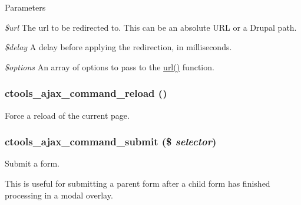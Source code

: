 \begin{DoxyParams}{Parameters}
\item[{\em \$url}]The url to be redirected to. This can be an absolute URL or a Drupal path. \item[{\em \$delay}]A delay before applying the redirection, in milliseconds. \item[{\em \$options}]An array of options to pass to the \hyperlink{common_8inc_a43b2a0594431556db49df980801d8807}{url()} function. \end{DoxyParams}
\hypertarget{profiles_2dosomething_2modules_2contrib_2ctools_2includes_2ajax_8inc_abadcd3021f5a0dedff23944d40dbc1ae}{
\subsubsection[{ctools\_\-ajax\_\-command\_\-reload}]{\setlength{\rightskip}{0pt plus 5cm}ctools\_\-ajax\_\-command\_\-reload ()}}
\label{profiles_2dosomething_2modules_2contrib_2ctools_2includes_2ajax_8inc_abadcd3021f5a0dedff23944d40dbc1ae}
Force a reload of the current page. \hypertarget{profiles_2dosomething_2modules_2contrib_2ctools_2includes_2ajax_8inc_a911fe17d610b49cdf90a6d3009bab2b6}{
\subsubsection[{ctools\_\-ajax\_\-command\_\-submit}]{\setlength{\rightskip}{0pt plus 5cm}ctools\_\-ajax\_\-command\_\-submit (\$ {\em selector})}}
\label{profiles_2dosomething_2modules_2contrib_2ctools_2includes_2ajax_8inc_a911fe17d610b49cdf90a6d3009bab2b6}
Submit a form.

This is useful for submitting a parent form after a child form has finished processing in a modal overlay.


